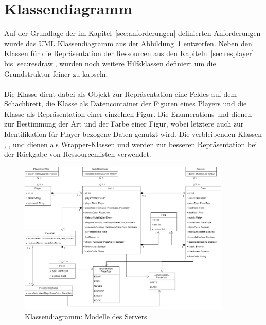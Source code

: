 \section{Klassendiagramm}
Auf der Grundlage der im \hyperref[sec:anforderungen]{Kapitel~\ref{sec:anforderungen}} definierten Anforderungen wurde das \gls{UML} Klassendiagramm aus der \hyperref[fig:classdiagram]{Abbildung~\ref{fig:classdiagram}} entworfen. Neben den Klassen für die Repräsentation der Ressourcen aus den \hyperref[sec:resplayer, sec:resdraw]{Kapiteln~\ref{sec:resplayer} bis \ref{sec:resdraw}}, wurden noch weitere Hilfsklassen definiert um die Grundstruktur feiner zu kapseln.\\
\\
Die Klasse  dient dabei als Objekt zur Repräsentation eine Feldes auf dem Schachbrett, die Klasse  als Datencontainer der Figuren eines Players und die Klasse  als Repräsentation einer einzelnen Figur. Die Enumerations  und  dienen zur Bestimmung der Art und der Farbe einer Figur, wobei letztere auch zur Identifikation für Player bezogene Daten genutzt wird. Die verbleibenden Klassen , ,  und  dienen als Wrapper-Klassen und werden zur besseren Repräsentation bei der Rückgabe von Ressourcenlisten verwendet.
\begin{figure}
	\includegraphics[width=0.9\textwidth]{images/classdiagram.png}
	\caption{Klassendiagramm: Modelle des Servers}
	\label{fig:classdiagram}
\end{figure}

